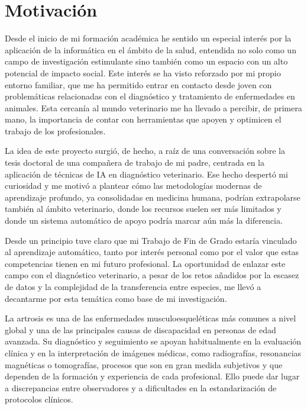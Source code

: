 \documentclass[11pt,spanish,listoffigures,listoftables]{tfgetsinf}
\begin{document}
\section{Motivación}     %

Desde el inicio de mi formación académica he sentido un especial interés por la
aplicación de la informática en el ámbito de la salud, entendida no solo como
un campo de investigación estimulante sino también como un espacio con un alto
potencial de impacto social. Este interés se ha visto reforzado por mi propio
entorno familiar, que me ha permitido entrar en contacto desde joven con
problemáticas relacionadas con el diagnóstico y tratamiento de enfermedades en
animales. Esta cercanía al mundo veterinario me ha llevado a percibir, de
primera mano, la importancia de contar con herramientas que apoyen y optimicen
el trabajo de los profesionales. 

La idea de este proyecto surgió, de hecho, a raíz de una conversación sobre la
tesis doctoral de una compañera de trabajo de mi padre, centrada en la
aplicación de técnicas de IA en diagnóstico veterinario. Ese hecho despertó mi
curiosidad y me motivó a plantear cómo las metodologías modernas de aprendizaje
profundo, ya consolidadas en medicina humana, podrían extrapolarse también al
ámbito veterinario, donde los recursos suelen ser más limitados y donde un
sistema automático de apoyo podría marcar aún más la diferencia.

Desde un principio tuve claro que mi Trabajo de Fin de Grado estaría vinculado
al aprendizaje automático, tanto por interés personal como por el valor que
estas competencias tienen en mi futuro profesional. La oportunidad de enlazar
este campo con el diagnóstico veterinario, a pesar de los retos añadidos por la
escasez de datos y la complejidad de la transferencia entre especies, me llevó
a decantarme por esta temática como base de mi investigación.

La artrosis es una de las enfermedades musculoesqueléticas
más comunes a nivel global y una de las principales causas de discapacidad en
personas de edad avanzada. Su diagnóstico y seguimiento se apoyan
habitualmente en la evaluación clínica y en la interpretación de imágenes
médicas, como radiografías, resonancias magnéticas o tomografías, procesos que
son en gran medida subjetivos y que dependen de la formación y experiencia de
cada profesional. Ello puede dar lugar a discrepancias entre observadores y a
dificultades en la estandarización de protocolos clínicos. 
\end{document}
